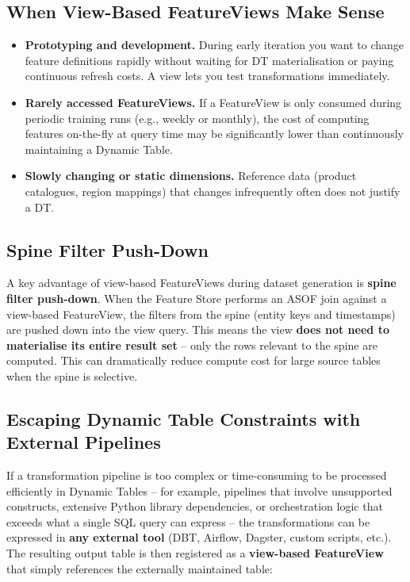 \documentclass[
  letterpaper,
  DIV=11,
  numbers=noendperiod]{scrreprt}
\providecommand{\tightlist}{%
  \setlength{\itemsep}{0pt}\setlength{\parskip}{0pt}}\usepackage{longtable,booktabs,array}
\begin{document}
\hypertarget{when-view-based-featureviews-make-sense}{%
\subsection{When View-Based FeatureViews Make
Sense}\label{when-view-based-featureviews-make-sense}}

\begin{itemize}
\tightlist
\item
  \textbf{Prototyping and development.} During early iteration you want
  to change feature definitions rapidly without waiting for DT
  materialisation or paying continuous refresh costs. A view lets you
  test transformations immediately.
\item
  \textbf{Rarely accessed FeatureViews.} If a FeatureView is only
  consumed during periodic training runs (e.g., weekly or monthly), the
  cost of computing features on-the-fly at query time may be
  significantly lower than continuously maintaining a Dynamic Table.
\item
  \textbf{Slowly changing or static dimensions.} Reference data (product
  catalogues, region mappings) that changes infrequently often does not
  justify a DT.
\end{itemize}

\hypertarget{spine-filter-push-down}{%
\subsection{Spine Filter Push-Down}\label{spine-filter-push-down}}

A key advantage of view-based FeatureViews during dataset generation is
\textbf{spine filter push-down}. When the Feature Store performs an ASOF
join against a view-based FeatureView, the filters from the spine
(entity keys and timestamps) are pushed down into the view query. This
means the view \textbf{does not need to materialise its entire result
set} -- only the rows relevant to the spine are computed. This can
dramatically reduce compute cost for large source tables when the spine
is selective.

\hypertarget{escaping-dynamic-table-constraints-with-external-pipelines}{%
\subsection{Escaping Dynamic Table Constraints with External
Pipelines}\label{escaping-dynamic-table-constraints-with-external-pipelines}}

If a transformation pipeline is too complex or time-consuming to be
processed efficiently in Dynamic Tables -- for example, pipelines that
involve unsupported constructs, extensive Python library dependencies,
or orchestration logic that exceeds what a single SQL query can express
-- the transformations can be expressed in \textbf{any external tool}
(DBT, Airflow, Dagster, custom scripts, etc.). The resulting output
table is then registered as a \textbf{view-based FeatureView} that
simply references the externally maintained table:
\end{document}
